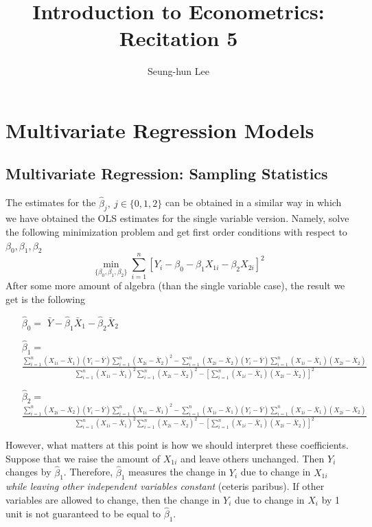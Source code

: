 \documentclass[12pt]{article}
\title{Introduction to Econometrics: Recitation 5}
\theoremstyle{definition}
\theoremstyle{property}
\theoremstyle{assumption}
\theoremstyle{example}
\theoremstyle{comment}
\begin{document}
\linespread{1.25}
\author{Seung-hun Lee}
\date{}
\maketitle

\section{Multivariate Regression Models}

\subsection{Multivariate Regression: Sampling Statistics}
The estimates for the $\hat{\beta}_j, \ j\in\{0,1,2\}$ can be obtained in a similar way in which we have obtained the OLS estimates for the single variable version. Namely, solve the following minimization problem and get first order conditions with respect to $\beta_0, \beta_1, \beta_2$
\[
\min_{\{\beta_0,\beta_1,\beta_2\}} \sum_{i=1}^n[Y_i-\beta_0 - \beta_1X_{1i}-\beta_2X_{2i}]^2
\]
After some more amount of algebra (than the single variable case), the result we get is the following
\begin{itemize}
\item[$\hat{\beta}_0=$] $\bar{Y}-\hat{\beta}_1\bar{X}_1-\hat{\beta}_2\bar{X}_2$
\item[$\hat{\beta}_1=$] $\frac{\sum_{i=1}^n (X_{1i}-\bar{X}_1)(Y_{i}-\bar{Y})\sum_{i=1}^n(X_{2i}-\bar{X}_2)^2-\sum_{i=1}^n (X_{2i}-\bar{X}_2)(Y_{i}-\bar{Y})\sum_{i=1}^n(X_{1i}-\bar{X}_1)(X_{2i}-\bar{X}_2)}{\sum_{i=1}^n (X_{1i}-\bar{X}_1)^2\sum_{i=1}^n (X_{2i}-\bar{X}_2)^2-[\sum_{i=1}^n (X_{1i}-\bar{X}_1)(X_{2i}-\bar{X}_2)]^2}$
\item[$\hat{\beta}_2=$] $\frac{\sum_{i=1}^n (X_{2i}-\bar{X}_2)(Y_{i}-\bar{Y})\sum_{i=1}^n(X_{1i}-\bar{X}_1)^2-\sum_{i=1}^n (X_{1i}-\bar{X}_1)(Y_{i}-\bar{Y})\sum_{i=1}^n(X_{1i}-\bar{X}_1)(X_{2i}-\bar{X}_2)}{\sum_{i=1}^n (X_{1i}-\bar{X}_1)^2\sum_{i=1}^n (X_{2i}-\bar{X}_2)^2-[\sum_{i=1}^n (X_{1i}-\bar{X}_1)(X_{2i}-\bar{X}_2)]^2}$
\end{itemize} \par\medskip
However, what matters at this point is how we should interpret these coefficients. Suppose that we raise the amount of $X_{1i}$ and leave others unchanged. Then $Y_i$ changes by $\hat{\beta}_1$. Therefore, $\hat{\beta}_1$ measures the change in $Y_i$ due to change in $X_{1i}$ \emph{while leaving other independent variables constant} (ceteris paribus). If other variables are allowed to change, then the change in $Y_i$ due to change in $X_i$ by 1 unit is not guaranteed to be equal to $\hat{\beta}_1$.
\end{document}
